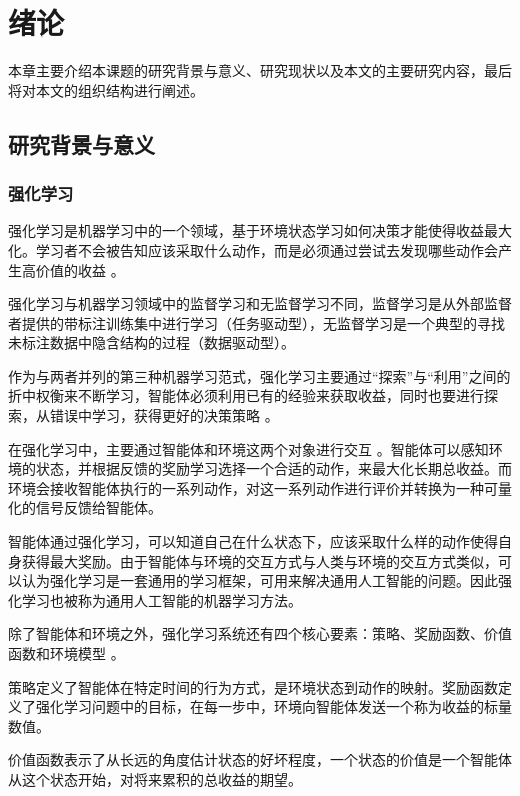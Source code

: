 
\chapter{绪论}

本章主要介绍本课题的研究背景与意义、研究现状以及本文的主要研究内容，最后将对本文的组织结构进行阐述。

\section{研究背景与意义}

\subsection{强化学习}

强化学习是机器学习中的一个领域，基于环境状态学习如何决策才能使得收益最大化。学习者不会被告知应该采取什么动作，而是必须通过尝试去发现哪些动作会产生高价值的收益 \cite{sutton2018reinforcement}。

强化学习与机器学习领域中的监督学习和无监督学习不同，监督学习是从外部监督者提供的带标注训练集中进行学习（任务驱动型），无监督学习是一个典型的寻找未标注数据中隐含结构的过程（数据驱动型）。

作为与两者并列的第三种机器学习范式，强化学习主要通过“探索”与“利用”之间的折中权衡来不断学习，智能体必须利用已有的经验来获取收益，同时也要进行探索，从错误中学习，获得更好的决策策略 \cite{kaelbling1996reinforcement}。

在强化学习中，主要通过智能体和环境这两个对象进行交互 \cite{tan1993multi}。智能体可以感知环境的状态，并根据反馈的奖励学习选择一个合适的动作，来最大化长期总收益。而环境会接收智能体执行的一系列动作，对这一系列动作进行评价并转换为一种可量化的信号反馈给智能体。

智能体通过强化学习，可以知道自己在什么状态下，应该采取什么样的动作使得自身获得最大奖励。由于智能体与环境的交互方式与人类与环境的交互方式类似，可以认为强化学习是一套通用的学习框架，可用来解决通用人工智能的问题。因此强化学习也被称为通用人工智能的机器学习方法。 \cite{shoham2003multi}

除了智能体和环境之外，强化学习系统还有四个核心要素：策略、奖励函数、价值函数和环境模型 \cite{szepesvari2010algorithms}。

策略定义了智能体在特定时间的行为方式，是环境状态到动作的映射。奖励函数定义了强化学习问题中的目标，在每一步中，环境向智能体发送一个称为收益的标量数值。

价值函数表示了从长远的角度估计状态的好坏程度，一个状态的价值是一个智能体从这个状态开始，对将来累积的总收益的期望。

